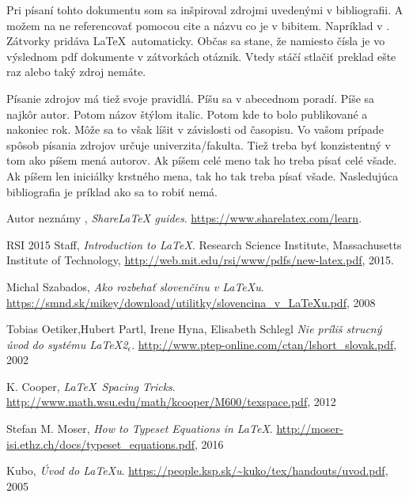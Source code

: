 \documentclass[11pt, a4paper]{article}
\begin{document}
Pri písaní tohto dokumentu som sa inšpiroval zdrojmi uvedenými v bibliografii. A možem na ne referencovať pomocou cite a názvu co je v bibitem. Napríklad v \cite{ShareLaTeX}. Zátvorky pridáva \LaTeX\ automaticky. Občas sa stane, že namiesto čísla je vo výslednom pdf dokumente v zátvorkách otáznik. Vtedy stáčí stlačiť preklad ešte raz alebo taký zdroj nemáte.

Písanie zdrojov má tiež svoje pravidlá. Píšu sa v abecednom poradí. Píše sa najkôr autor. Potom názov štýlom italic. Potom kde to bolo publikované a nakoniec rok. Môže sa to však líšit v závislosti od časopisu. Vo vašom prípade spôsob písania zdrojov určuje univerzita/fakulta. Tiež treba byť konzistentný v tom ako píšem mená autorov. Ak píšem celé meno tak ho treba písať celé všade. Ak píšem len iniciálky krstného mena, tak ho tak treba písať všade. Nasledujúca bibliografia je príklad ako sa to robiť nemá.

\begin{thebibliography}{9} %
Autor neznámy , \textit{ShareLaTeX guides}. 
\url{https://www.sharelatex.com/learn}.
 
RSI 2015 Staff, \textit{Introduction to \LaTeX}. Research Science Institute, Massachusetts Institute of Technology, \url{http://web.mit.edu/rsi/www/pdfs/new-latex.pdf}, 2015.

Michal Szabados, \textit{Ako rozbehať slovenčinu v \LaTeX u}. \url{https://smnd.sk/mikey/download/utilitky/slovencina_v_LaTeXu.pdf}, 2008

Tobias Oetiker,Hubert Partl, Irene Hyna, Elisabeth Schlegl \textit{Nie príliš strucný úvod do systému \LaTeX\textnormal{2}$_\epsilon$}. \url{http://www.ptep-online.com/ctan/lshort_slovak.pdf}, 2002

K. Cooper, \textit{\LaTeX\ Spacing Tricks}. \url{http://www.math.wsu.edu/math/kcooper/M600/texspace.pdf}, 2012

Stefan M. Moser, \textit{How to Typeset Equations in \LaTeX}. \url{http://moser-isi.ethz.ch/docs/typeset_equations.pdf}, 2016

Kubo, \textit{Úvod do \LaTeX u}. \url{https://people.ksp.sk/~kuko/tex/handouts/uvod.pdf}, 2005
\end{thebibliography}
\end{document}
